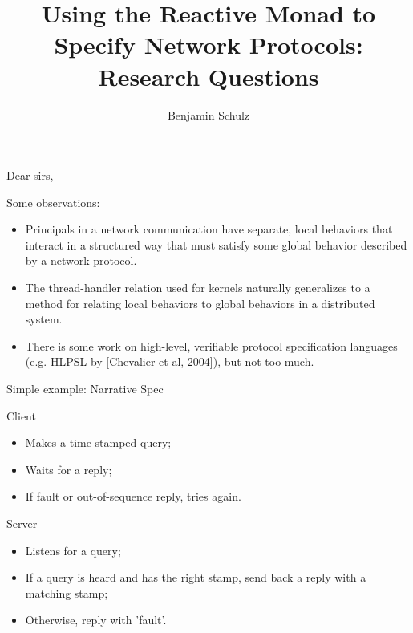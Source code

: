\documentclass{beamer}
\title{Using the Reactive Monad to Specify Network Protocols: Research Questions}
\author{Benjamin Schulz}
\begin{document}
\maketitle

\begin{frame}{Dear sirs,}

\begin{structure}{Some observations:}
\begin{itemize}

\item{Principals in a network communication have separate, local behaviors that interact in a
structured way that must satisfy some global behavior described by a network protocol.}

 \item{The thread-handler relation used for kernels naturally generalizes to a method for relating
local behaviors to global behaviors in a distributed system.}

\item{There is some work on high-level, verifiable protocol specification languages
(e.g. HLPSL by [Chevalier et al, 2004]), but not too much.}
\end{itemize}
\end{structure}

\emph{\color{red}{Does specifying the roles of a protocol as different reactive monads offer some advantage
in implementing or verifying protocols?}}


\end{frame}


\begin{frame}{Simple example: Narrative Spec}
 
\begin{structure}{Client}

\begin{itemize}
 \item {Makes a time-stamped query;}
 \item{Waits for a reply;}
 \item{If fault or out-of-sequence reply, tries again.}
\end{itemize}

 
\end{structure}

\begin{structure}{Server}

\begin{itemize}
\item{Listens for a query;}

\item{If a query is heard and has the right stamp, send back a reply with a matching stamp;}

\item{Otherwise, reply with 'fault'.}
\end{itemize}

\end{structure}


\end{frame}
\end{document}
